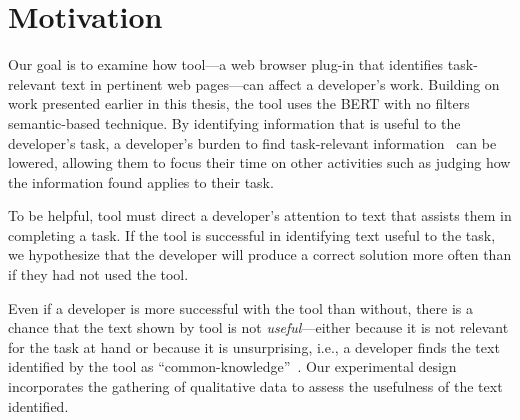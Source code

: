 


\section{Motivation}
\label{cp6:method}



Our goal is to examine how \acs{tool}---a web browser plug-in that 
 identifies
task-relevant text in pertinent
web pages---can affect a developer's work.
Building on work presented earlier in this
thesis, the tool  uses the BERT with no filters semantic-based technique.
By identifying information that is useful to the developer's task,
a developer's burden to find task-relevant information~\cite{Robillard2015}
can be lowered,
allowing them to focus their time on other activities such as judging how the information found applies to their task.


To be helpful, \acs{tool} must direct a developer's attention to text that assists them in completing a task.
If the tool is successful in identifying text useful to the task, we hypothesize that
the developer will produce a correct solution more often than if they had not used the tool.


Even if a developer is more successful
with the tool than without, there is a chance that the text shown by \acs{tool} is not \textit{useful}---either because it is not relevant for the task at hand or because it is unsurprising, i.e.,
a developer finds the text identified by the tool as ``common-knowledge''~\cite{cwalina2008, Robillard2015}. Our experimental design incorporates the gathering of qualitative data to assess the usefulness of the text identified.

 

